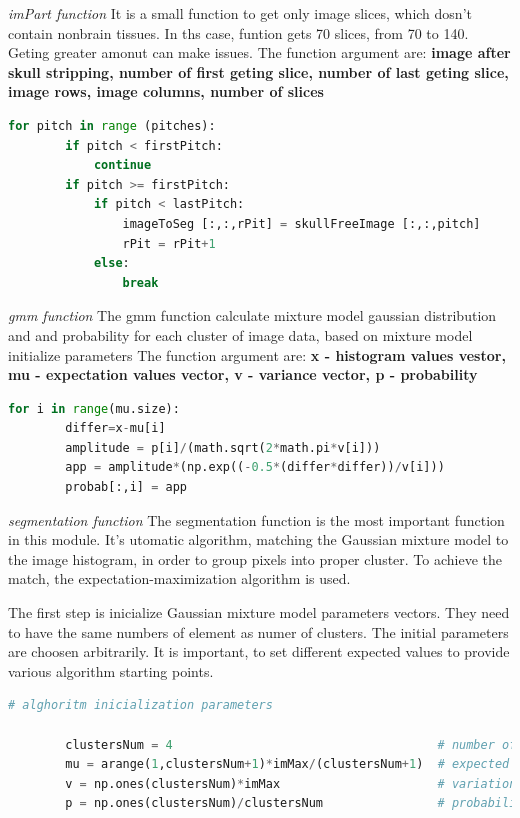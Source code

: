 \textit{imPart function}
It is a small function to get only image slices, which dosn't contain nonbrain tissues. In ths case, funtion gets 70 slices, from 70 to 140. Geting greater amonut can make issues. 
The function argument are: \textbf{image after skull stripping, number of first geting slice, number of last geting slice, image rows, image columns, number of slices}
\\
\begin{lstlisting}[language=Python, caption = PGeting part of image to segmentation]
    for pitch in range (pitches):
        if pitch < firstPitch:
            continue
        if pitch >= firstPitch:
            if pitch < lastPitch:
                imageToSeg [:,:,rPit] = skullFreeImage [:,:,pitch]
                rPit = rPit+1
            else:
                break
\end{lstlisting}


\textit{gmm function}
The gmm function calculate mixture model gaussian distribution and and probability for each cluster of image data, based on mixture model initialize parameters
The function argument are: \textbf{x - histogram values vestor, mu - expectation values vector, v - variance vector, p - probability}

\begin{lstlisting}[language=Python, caption = PGeting part of image to segmentation]
for i in range(mu.size):
        differ=x-mu[i]
        amplitude = p[i]/(math.sqrt(2*math.pi*v[i]))
        app = amplitude*(np.exp((-0.5*(differ*differ))/v[i]))
        probab[:,i] = app	
\end{lstlisting}


\textit{segmentation function}
The segmentation function is the most important function in this module. It's utomatic algorithm, matching the Gaussian mixture model to the image histogram, in order to group pixels into proper cluster. To achieve the match, the expectation-maximization algorithm is used. 

The first step is inicialize Gaussian mixture model parameters vectors. They need to have the same numbers of element as numer of clusters. The initial parameters are choosen arbitrarily. It is important, to set different expected values to provide various algorithm starting points. 

\begin{lstlisting}[language=Python, caption = PGeting part of image to segmentation]
# alghoritm inicialization parameters

        clustersNum = 4										# number of clusters
        mu = arange(1,clustersNum+1)*imMax/(clustersNum+1)	# expected value of each clusters
        v = np.ones(clustersNum)*imMax						# variation of each clusters
        p = np.ones(clustersNum)/clustersNum				# probability of each clusters
\end{lstlisting}

